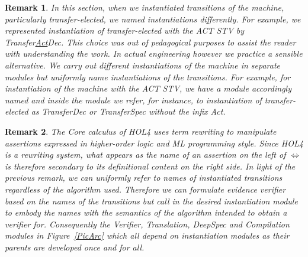\documentclass[10pt,conference]{IEEEtran}
\newtheorem{remark}{Remark}
\begin{document}
\begin{remark}\label{naming}
In this section, when we instantiated transitions of the machine, particularly transfer-elected, we named instantiations differently. For example, we represented instantiation of transfer-elected with the ACT STV by  Transfer\underline{Act}Dec. This choice was out of pedagogical purposes to assist the reader with understanding the work. In actual engineering however we practice a sensible alternative. We carry out different instantiations of the machine in separate modules but uniformly name instantiations of the transitions. For example, for instantiation of the machine with the ACT STV, we have a module accordingly named and inside the module we refer, for instance, to instantiation of transfer-elected as TransferDec or TransferSpec without the infix Act.
\end{remark}
\begin{remark}\label{rewrting}
The Core calculus of HOL4 uses \emph{term rewriting} to manipulate assertions expressed in higher-order logic and ML programming style.   
Since HOL4 is a rewriting system, what appears as the name of an assertion on the left of $\Leftrightarrow$ is therefore secondary to its definitional content on the right side. In light of the previous remark, we can uniformly refer to \emph{names} of instantiated transitions regardless of the algorithm used. Therefore we can formulate evidence verifier based on the names of the transitions but call in the desired instantiation  module to embody the names with the semantics  of the algorithm intended to obtain a verifier for. Consequently the Verifier, Translation, DeepSpec and Compilation modules in Figure~\ref{PicArc} which all depend on instantiation modules as their parents  are  developed once and for all.   
\end{remark}

 
\end{document}
